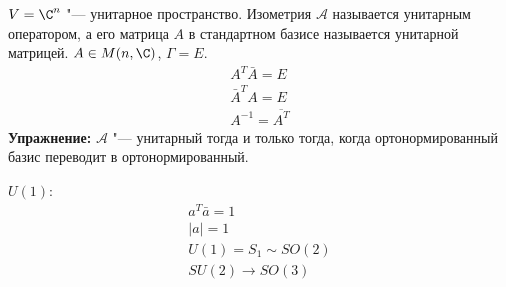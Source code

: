 \begin{exmp}
	$V = \C^n$ "--- унитарное пространство.
	Изометрия $\mathcal A$ называется  унитарным оператором, а его матрица $A$ в стандартном базисе называется унитарной матрицей.
	$A \in M(n, \C)$, $\Gamma = E$.
	\begin{gather*}
		A^T \bar A  = E \\
		\bar A^T A = E \\
		A^{-1} = \overline{A^T}
	\end{gather*}
	\textbf{Упражнение:} $\mathcal A$ "--- унитарный тогда и только тогда, когда ортонормированный базис переводит в ортонормированный.
\end{exmp}
\begin{exmp}
	$U(1)$:
	\begin{gather*}
		a^T \bar a  = 1 \\
		|a| = 1 \\
		U(1) = S_1 \sim SO(2) \\
		SU(2) \to SO(3)
	\end{gather*}
\end{exmp}
